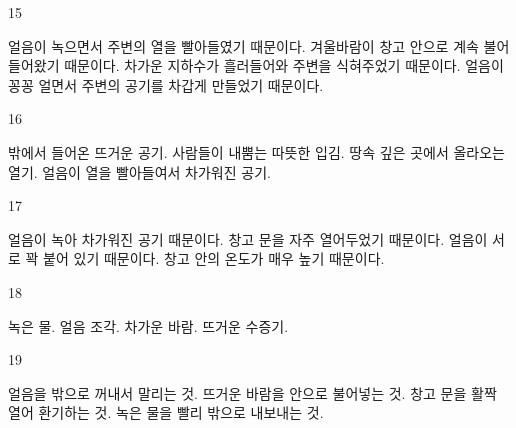 \documentclass[fs9,seriesFre]{korfarm-base}
\begin{document}
\begin{kfSentenceUnit}{15}{}
\begin{kfChoices}
\kfChoice 얼음이 녹으면서 주변의 열을 빨아들였기 때문이다.
\kfChoice 겨울바람이 창고 안으로 계속 불어 들어왔기 때문이다.
\kfChoice 차가운 지하수가 흘러들어와 주변을 식혀주었기 때문이다.
\kfChoice 얼음이 꽁꽁 얼면서 주변의 공기를 차갑게 만들었기 때문이다.
\end{kfChoices}
\end{kfSentenceUnit}

\begin{kfSentenceUnit}{16}{}
\begin{kfChoices}
\kfChoice 밖에서 들어온 뜨거운 공기.
\kfChoice 사람들이 내뿜는 따뜻한 입김.
\kfChoice 땅속 깊은 곳에서 올라오는 열기.
\kfChoice 얼음이 열을 빨아들여서 차가워진 공기.
\end{kfChoices}
\end{kfSentenceUnit}

\begin{kfSentenceUnit}{17}{}
\begin{kfChoices}
\kfChoice 얼음이 녹아 차가워진 공기 때문이다.
\kfChoice 창고 문을 자주 열어두었기 때문이다.
\kfChoice 얼음이 서로 꽉 붙어 있기 때문이다.
\kfChoice 창고 안의 온도가 매우 높기 때문이다.
\end{kfChoices}
\end{kfSentenceUnit}

\begin{kfSentenceUnit}{18}{}
\begin{kfChoices}
\kfChoice 녹은 물.
\kfChoice 얼음 조각.
\kfChoice 차가운 바람.
\kfChoice 뜨거운 수증기.
\end{kfChoices}
\end{kfSentenceUnit}

\begin{kfSentenceUnit}{19}{}
\begin{kfChoices}
\kfChoice 얼음을 밖으로 꺼내서 말리는 것.
\kfChoice 뜨거운 바람을 안으로 불어넣는 것.
\kfChoice 창고 문을 활짝 열어 환기하는 것.
\kfChoice 녹은 물을 빨리 밖으로 내보내는 것.
\end{kfChoices}
\end{kfSentenceUnit}
\end{document}
